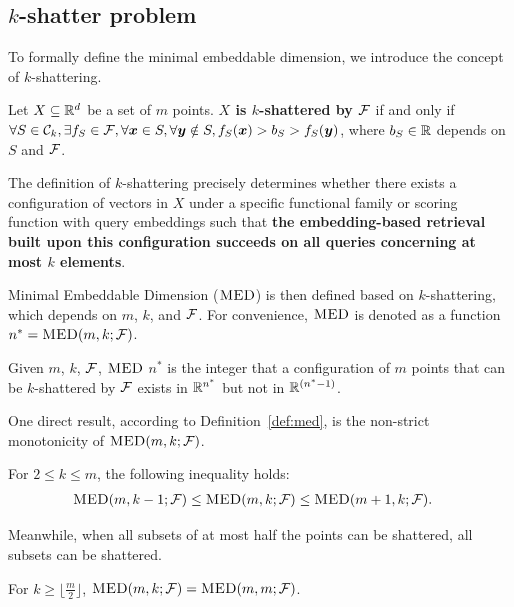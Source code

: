 \documentclass[10pt]{article}
\begin{document}
\subsection{$k$-shatter problem}
To formally define the minimal embeddable dimension, we introduce the concept of $k$-shattering.
\begin{definition}[$k$-shattering]
    Let $X\subseteq \mathbb{R}^d$ be a set of $m$ points. \textbf{$X$ is $k$-shattered by $\mathcal{F}$} if and only if  $\forall S\in \mathcal{C}_k,\exists f_S\in \mathcal{F},\forall \bm{x} \in S,\forall \bm{y}\notin S, f_S(\bm{x}) > b_S > f_S(\bm{y})$, where $b_S\in \mathbb{R}$ depends on $S$ and $\mathcal{F}$.
\end{definition} 

\begin{remark}
    The definition of $k$-shattering precisely determines whether there exists a configuration of vectors in $X$ under a specific functional family or scoring function with query embeddings such that \textbf{the embedding-based retrieval built upon this configuration succeeds on all queries concerning at most $k$ elements}.
\end{remark}

Minimal Embeddable Dimension ($\textsc{MED}$) is then defined based on $k$-shattering, which depends on $m$, $k$, and $\mathcal{F}$. For convenience, $\textsc{MED}$ is denoted as a function $n^*=\textsc{MED}(m, k; \mathcal{F})$.
\begin{definition}\label{def:med}
    Given $m$, $k$, $\mathcal{F}$, $\textsc{MED}$ $n^*$ is the integer that a configuration of $m$ points that can be $k$-shattered by $\mathcal{F}$ exists in $\mathbb{R}^{n^*}$ but not in $\mathbb{R}^{(n^*-1)}$.
\end{definition}

One direct result, according to Definition~\ref{def:med}, is the non-strict monotonicity of $\textsc{MED}(m, k; \mathcal{F})$.
\begin{proposition}\label{prop:monotonic}
For $2\leq k\leq m$, the following inequality holds:
\begin{align*}
    \textsc{MED}(m, k-1;\mathcal{F}) &\leq \textsc{MED}(m, k; \mathcal{F}) \leq \textsc{MED}(m+1, k; \mathcal{F}).
\end{align*}
\end{proposition}

Meanwhile, when all subsets of at most half the points can be shattered, all subsets can be shattered.
\begin{proposition}\label{prop:half-shatter}
    For $k\geq \lfloor \frac{m}{2} \rfloor$, $\textsc{MED}(m, k;\mathcal{F}) = \textsc{MED}(m, m;\mathcal{F})$.
\end{proposition}
\end{document}
